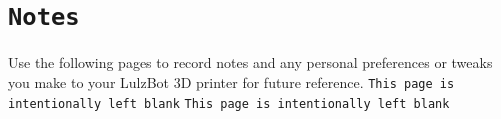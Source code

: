 %
%
%
%
%


\section{\texttt{Notes}}
Use the following pages to record notes and any personal preferences or tweaks you make to your LulzBot 3D printer for future reference.
\thispagestyle{empty}
\begingroup
\newpage
\mbox{}
\null
\vfill
\thispagestyle{empty}
\texttt{This page is intentionally left blank}
\newpage
\mbox{}
\null
\vfill
\thispagestyle{empty}
\texttt{This page is intentionally left blank}
\endgroup
